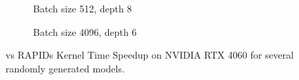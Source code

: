 \begin{figure}[ht]
  \centering
  \begin{subfigure}[b]{.45\textwidth}
    \caption{Batch size 512, depth 8}
  \end{subfigure}
  \begin{subfigure}[b]{.45\textwidth}
    \caption{Batch size 4096, depth 6}
  \end{subfigure}
  \hfill
  \caption{\label{fig:randomModels4060}\Treebeard{} vs RAPIDs Kernel Time Speedup on NVIDIA RTX 4060 for several randomly generated models.}
\end{figure}


